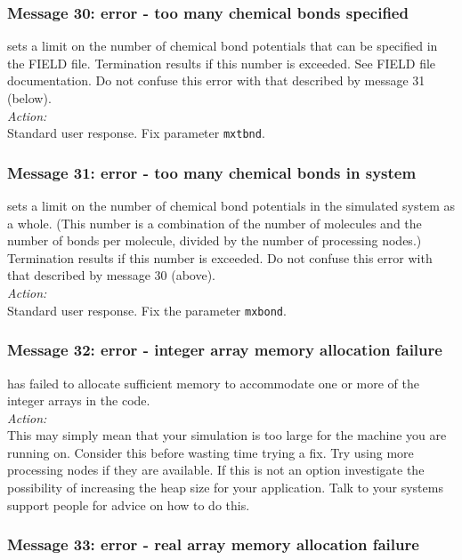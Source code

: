 \subsubsection*{Message 30: error - too many chemical bonds specified}

\D{} sets a limit on the number of chemical bond
potentials  that
can be specified in the FIELD file. Termination results if this number
is exceeded. See FIELD file documentation. Do not confuse this error
with that described by message 31 (below). \\ 

\noindent
{\em Action:} \\ 
Standard user response. Fix parameter {\tt mxtbnd}.

\subsubsection*{Message 31: error - too many chemical bonds in system}

\D{} sets a limit on the number of chemical bond  potentials in the
simulated system as a whole. (This number is a combination of the
number of molecules and the number of bonds per molecule, divided by
the number of processing nodes.) Termination results if this number is
exceeded. Do not confuse this error with that described by message
30 (above). \\ 

\noindent
{\em Action:} \\ 
Standard user response. Fix the parameter {\tt mxbond}.

\subsubsection*{Message 32: error - integer array memory allocation
failure}

\D{} has failed to allocate sufficient memory to accommodate one or more
of the integer arrays in the code. \\

\noindent
{\em Action:} \\ This may simply mean that your simulation is too
large for the machine you are running on. Consider this before wasting
time trying a fix. Try using more processing nodes if they are
available. If this is not an option investigate the possibility of
increasing the heap size for your application. Talk to your systems
support people for advice on how to do this. 

\subsubsection*{Message 33: error - real array memory allocation
failure}

